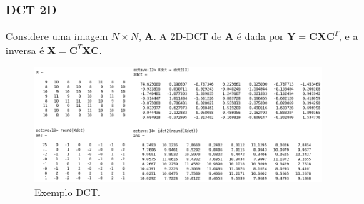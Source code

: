 \begin{frame}[allowframebreaks]
  \frametitle{DCT 2D}

  Considere uma imagem $N \times N$, $\mathbf{A}$.
  A 2D-DCT de $\mathbf{A}$ é dada por $\mathbf{Y} = \mathbf{C} \mathbf{X} \mathbf{C}^T$, e a
  inversa é $\mathbf{X} = \mathbf{C}^T \mathbf{X} \mathbf{C}$.

  \framebreak

    \begin{figure}[ht]
    \centering
    \includegraphics[width=0.95\textwidth]{images/ex-num-dct.png}
    \caption{Exemplo DCT.}
    \label{fig:dct_2d_ex}
    \end{figure}

\end{frame}


